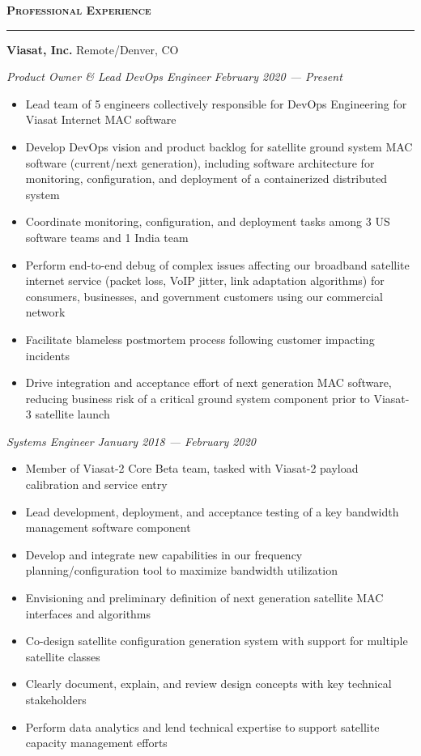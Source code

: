 \documentclass[10pt,letterpaper,hidelinks]{article}
\newcommand*{\seriffont}{\fontfamily{yv1}\selectfont}
\newenvironment{resumeSection}[1]{
{\Large \textbf{\textsc{#1}}}
\vspace{0.25em}
\hrule
\vspace{0.5em}
}{

}
\newenvironment{employer}[2]{
{\large \textbf{#1} \hfill #2} \newline
}{
\vspace{0.5em}
}
\newenvironment{position}[2]{
{\large \emph{#1} \hfill \emph{#2}}
\seriffont 
\begin{itemize}[noitemsep,topsep=0pt]
}{
\end{itemize}
\vspace{0.5em}
}
\begin{document}
\begin{resumeSection}{Professional Experience}
\begin{employer}{Viasat, Inc.}{Remote/Denver, CO}
\begin{position}{Product Owner \& Lead DevOps Engineer}{February 2020 --- Present}
\item Lead team of 5 engineers collectively responsible for DevOps Engineering for Viasat Internet MAC software
\item Develop DevOps vision and product backlog for satellite ground system MAC software (current/next generation), including software architecture for monitoring, configuration, and deployment of a containerized distributed system
\item Coordinate monitoring, configuration, and deployment tasks among 3 US software teams and 1 India team
\item Perform end-to-end debug of complex issues affecting our broadband satellite internet service (packet loss, VoIP jitter, link adaptation algorithms) for consumers, businesses, and government customers using our commercial network
\item Facilitate blameless postmortem process following customer impacting incidents
\item Drive integration and acceptance effort of next generation MAC software, reducing business risk of a critical ground system component prior to Viasat-3 satellite launch
\end {position}
\begin{position}{Systems Engineer}{January 2018 --- February 2020}
\item Member of Viasat-2 Core Beta team, tasked with Viasat-2 payload calibration and service entry
\item Lead development, deployment, and acceptance testing of a key bandwidth management software component
\item Develop and integrate new capabilities in our frequency planning/configuration tool to maximize bandwidth utilization
\item Envisioning and preliminary definition of next generation satellite MAC interfaces and algorithms
\item Co-design satellite configuration generation system with support for multiple satellite classes
\item Clearly document, explain, and review design concepts with key technical stakeholders
\item Perform data analytics and lend technical expertise to support satellite capacity management efforts

\end{position}
\end{employer}
\end{resumeSection}
\end{document}
